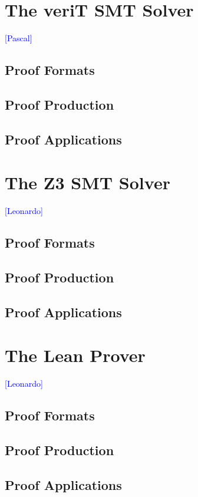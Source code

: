 \documentclass{llncs}
\newcommand{\Note}[1]{\textcolor{blue}{[#1]}}
\begin{document}
\section{The veriT SMT Solver}
\Note{Pascal}
\subsection{Proof Formats}
\subsection{Proof Production}
\subsection{Proof Applications}

\section{The Z3 SMT Solver}
\Note{Leonardo}
\subsection{Proof Formats}
\subsection{Proof Production}
\subsection{Proof Applications}

\section{The Lean Prover}
\Note{Leonardo}
\subsection{Proof Formats}
\subsection{Proof Production}
\subsection{Proof Applications}

\end{document}
